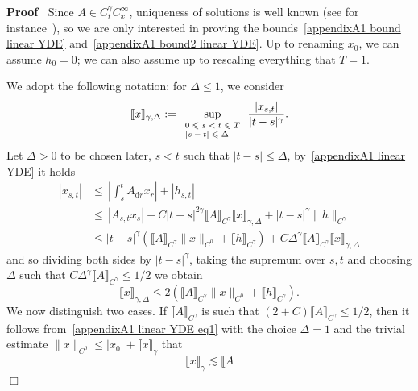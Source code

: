 \documentclass[10pt]{article}
\newcommand{\assign}{:=}
\newcommand{\mathd}{\mathrm{d}}
\newcommand{\tmscript}[1]{\text{\scriptsize{$#1$}}}
\newenvironment{proof}{\noindent\textbf{Proof\ }}{\hspace*{\fill}$\Box$\medskip}
\begin{document}
\begin{proof}
  Since $A \in C^{\gamma}_t C^{\infty}_x$, uniqueness of solutions is well
  known (see for instance~{\cite{lejay}}), so we are only interested in
  proving the bounds~{\eqref{appendixA1 bound linear YDE}}
  and~{\eqref{appendixA1 bound2 linear YDE}}. Up to renaming $x_0$, we can
  assume $h_0 = 0$; we can also assume up to rescaling everything that $T =
  1$.
  
  We adopt the following notation: for $\Delta \leqslant 1$, we consider
  \[ \llbracket x \rrbracket_{\gamma, \Delta} \assign
     \sup_{\tmscript{\begin{array}{l}
       0 \leqslant s < t \leqslant T\\
       | s - t | \leqslant \Delta
     \end{array}}}  \frac{| x_{s, t} |}{| t - s |^{\gamma}} . \]
  Let $\Delta > 0$ to be chosen later, $s < t$ such that $| t - s | \leqslant
  \Delta$, by~{\eqref{appendixA1 linear YDE}} it holds
%  
  \begin{align*}
    | x_{s, t} | & \leqslant \, \left| \int_s^t A_{\mathd r} x_r \right| + |
    h_{s, t} |\\
    & \leqslant \, | A_{s, t} x_s | + C | t - s |^{2 \gamma} \llbracket A
    \rrbracket_{C^{\gamma}}  \llbracket x \rrbracket_{\gamma, \Delta} + | t -
    s |^{\gamma} \| h \|_{C^{\gamma}}\\
    & \leqslant | t - s |^{\gamma} (\llbracket A \rrbracket_{C^{\gamma}} \| x
    \|_{C^0} + \llbracket h \rrbracket_{C^{\gamma}}) + C \Delta^{\gamma}
    \llbracket A \rrbracket_{C^{\gamma}} \llbracket x \rrbracket_{\gamma,
    \Delta}
  \end{align*}
%  
  and so dividing both sides by $| t - s |^{\gamma}$, taking the supremum over
  $s, t$ and choosing $\Delta$ such that $C \Delta^{\gamma} \llbracket A
  \rrbracket_{C^{\gamma}} \leqslant 1 / 2$ we obtain
  \begin{equation}
    \llbracket x \rrbracket_{\gamma, \Delta} \leqslant 2 (\llbracket A
    \rrbracket_{C^{\gamma}} \| x \|_{C^0} + \llbracket h
    \rrbracket_{C^{\gamma}}) . \label{appendixA1 linear YDE eq1}
  \end{equation}
  We now distinguish two cases. If $\llbracket A \rrbracket_{C^{\gamma}}$ is
  such that $(2 + C) \llbracket A \rrbracket_{C^{\gamma}} \leqslant 1 / 2$,
  then it follows from~{\eqref{appendixA1 linear YDE eq1}} with the choice
  $\Delta = 1$ and the trivial estimate $\| x \|_{C^0} \leqslant | x_0 | +
  \llbracket x \rrbracket_{\gamma}$ that
  \[ \llbracket x \rrbracket_{\gamma} \lesssim \llbracket A
\]
\end{proof}
\end{document}
